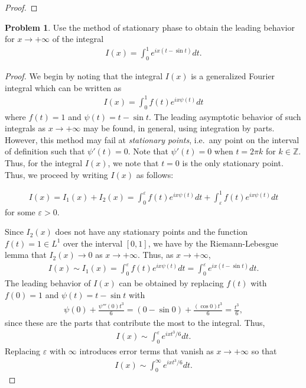 \documentclass[12pt]{article}
\theoremstyle{definition}
\newtheorem{problem}{Problem}
\begin{document}
\begin{proof}
\end{proof}
\newpage


\begin{problem}
  Use the method of stationary phase to obtain the leading behavior for $x\to+\infty$
  of the integral
  \begin{align*}
    I(x) = \int_0^1 e^{i x (t-\sin t)} dt.
  \end{align*}
\end{problem}

\begin{proof}
  We begin by noting that the integral $I(x)$ is a generalized Fourier integral
  which can be written as
  \begin{align*}
    I(x) = \int_0^1 f(t) e^{ix\psi(t)} dt
  \end{align*}
  where $f(t) = 1$ and $\psi(t) = t - \sin t$. The leading asymptotic behavior of
  such integrals as $x\to+\infty$ may be found, in general, using integration by parts.
  However, this method may fail at \emph{stationary points}, i.e.\ any point on
  the interval of definition such that $\psi'(t) = 0$. Note that $\psi'(t) = 0$
  when $t=2 \pi k$ for $k\in \mathbb{Z}$. Thus, for the integral
  $I(x)$, we note that $t = 0$ is the only stationary point.
  Thus, we proceed by writing $I(x)$ as follows:

  \begin{align*}
    I(x) = I_1(x) + I_2(x) = \int_0^\varepsilon f(t) e^{ix\psi(t)} dt + \int_\varepsilon^1 f(t) e^{ix\psi(t)} dt
  \end{align*}
  for some $\varepsilon > 0$.

  Since $I_2(x)$ does not have any stationary points and the
  function $f(t) = 1 \in L^1$ over the interval $[0, 1]$, we have by the Riemann-Lebesgue lemma that $I_2(x) \to 0$ as $x \to +\infty$. Thus,
  as $x\to +\infty$,
  \begin{align*}
    I(x) \sim I_1(x) = \int_0^\varepsilon f(t) e^{ix\psi(t)} dt = \int_0^\varepsilon e^{ix (t-\sin t)} dt.
  \end{align*}
  The leading behavior of $I(x)$ can be obtained by replacing $f(t)$ with $f(0) = 1$
  and $\psi(t) = t - \sin t$ with
  \begin{align*}
    \psi(0) + \frac{\psi'''(0)t^3}{6} = (0 - \sin 0) + \frac{(\cos 0) t^3}{6} = \frac{t^3}{6},
  \end{align*}
  since these are the parts that contribute the most to the integral. Thus,
  \begin{align*}
    I(x) \sim \int_0^\varepsilon e^{ix t^3/6} dt.
  \end{align*}
  Replacing $\varepsilon$ with $\infty$ introduces error terms that vanish as $x \to +\infty$ so that
  \begin{align*}
    I(x) \sim \int_0^\infty e^{ix t^3/6} dt.
  \end{align*}


\end{proof}
\end{document}
